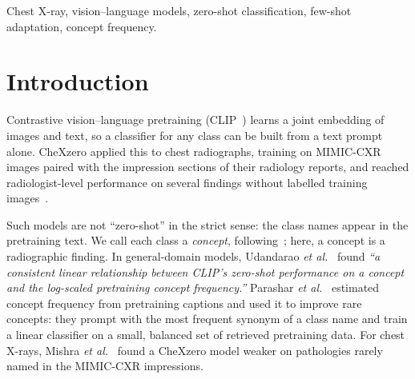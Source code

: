 \documentclass[journal]{IEEEtran}
\begin{document}
\begin{abstract}
\end{abstract}

\begin{IEEEkeywords}
Chest X-ray, vision--language models, zero-shot classification, few-shot adaptation, concept frequency.
\end{IEEEkeywords}

\section{Introduction}

Contrastive vision--language pretraining (CLIP~\cite{radford2021clip}) learns a joint embedding of
images and text, so a classifier for any class can be built from a text prompt alone. CheXzero
applied this to chest radiographs, training on MIMIC-CXR images paired with the impression sections
of their radiology reports, and reached radiologist-level performance on several findings without
labelled training images~\cite{tiu2022chexzero}.

Such models are not ``zero-shot'' in the strict sense: the class names appear in the pretraining text. We call each class a \emph{concept}, following~\cite{udandarao2024zeroshot}; here, a concept is a radiographic finding.
In general-domain models, Udandarao \emph{et al.}~\cite{udandarao2024zeroshot} found
\emph{``a consistent linear relationship between CLIP's zero-shot performance on a concept and the
log-scaled pretraining concept frequency.''}
Parashar \emph{et al.}~\cite{parashar2024neglected} estimated
concept frequency from pretraining captions and used it to improve rare concepts: they prompt with the
most frequent synonym of a class name and train a linear classifier on a small, balanced set of retrieved
pretraining data. For chest X-rays, Mishra \emph{et al.}~\cite{mishra2023improving} found a CheXzero model
weaker on pathologies rarely named in the MIMIC-CXR impressions.
\end{document}
